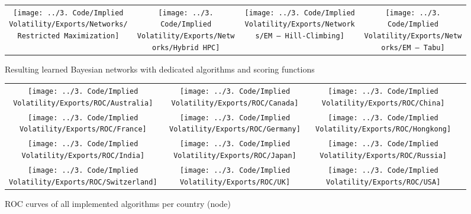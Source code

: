 \documentclass[twoside,twocolumn]{article}
\begin{document}
\begin{figure*}
{\begin{tabular}{cccc}
\texttt{[image: ../3. Code/Implied Volatility/Exports/Networks/Restricted Maximization]} &  \texttt{[image: ../3. Code/Implied Volatility/Exports/Networks/Hybrid HPC]} &  \texttt{[image: ../3. Code/Implied Volatility/Exports/Networks/EM – Hill-Climbing]} & \texttt{[image: ../3. Code/Implied Volatility/Exports/Networks/EM – Tabu]}  \\
\end{tabular}
}
\caption[Overview of all learned Bayesian networks]{Resulting learned Bayesian networks with dedicated algorithms and scoring functions}
  \label{fig:bayesnets}
\end{figure*}


\begin{figure*}
\begin{tabular}{cccc}
  \texttt{[image: ../3. Code/Implied Volatility/Exports/ROC/Australia]} &   \texttt{[image: ../3. Code/Implied Volatility/Exports/ROC/Canada]} &    \texttt{[image: ../3. Code/Implied Volatility/Exports/ROC/China]}  \\ \texttt{[image: ../3. Code/Implied Volatility/Exports/ROC/France]} &      \texttt{[image: ../3. Code/Implied Volatility/Exports/ROC/Germany]} &  \texttt{[image: ../3. Code/Implied Volatility/Exports/ROC/Hongkong]}  \\  \texttt{[image: ../3. Code/Implied Volatility/Exports/ROC/India]} &   \texttt{[image: ../3. Code/Implied Volatility/Exports/ROC/Japan]} &    \texttt{[image: ../3. Code/Implied Volatility/Exports/ROC/Russia]} \\
    \texttt{[image: ../3. Code/Implied Volatility/Exports/ROC/Switzerland]} &       \texttt{[image: ../3. Code/Implied Volatility/Exports/ROC/UK]} &  \texttt{[image: ../3. Code/Implied Volatility/Exports/ROC/USA]}  \\
\end{tabular}
\caption[ROC curves of all implemented algorithms per country (node)]{ROC curves of all implemented algorithms per  country (node)}
  \label{fig:roccurves}
\end{figure*}
\end{document}

